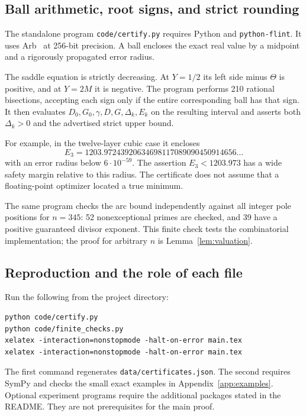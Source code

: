 \subsection{Ball arithmetic, root signs, and strict rounding}

The standalone program \texttt{code/certify.py} requires Python and
\texttt{python-flint}. It uses Arb~\cite{Arb} at 256-bit precision.
A ball encloses the exact real value by a midpoint and a rigorously
propagated error radius.

The saddle equation is strictly decreasing. At \(Y=1/2\) its
left side minus \(\Theta\) is positive, and at \(Y=2M\) it is
negative. The program performs 210 rational bisections, accepting
each sign only if the entire corresponding ball has that sign.
It then evaluates \(D_0,G_0,\gamma,D,G,\Delta_k,E_k\) on the
resulting interval and asserts both \(\Delta_k>0\) and the advertised
strict upper bound.

For example, in the twelve-layer cubic case it encloses
\[
E_3=1203.97243920634698117089090450914656\ldots
\]
with an error radius below \(6\cdot10^{-59}\).
The assertion \(E_3<1203.973\) has a wide safety margin relative
to this radius. The certificate does not assume that a floating-point
optimizer located a true minimum.

The same program checks the arc bound independently against
all integer pole positions for \(n=345\): 52 nonexceptional primes
are checked, and 39 have a positive guaranteed divisor exponent.
This finite check tests the combinatorial implementation; the
proof for arbitrary \(n\) is Lemma~\ref{lem:valuation}.

\subsection{Reproduction and the role of each file}

Run the following from the project directory:
\begin{verbatim}
python code/certify.py
python code/finite_checks.py
xelatex -interaction=nonstopmode -halt-on-error main.tex
xelatex -interaction=nonstopmode -halt-on-error main.tex
\end{verbatim}
The first command regenerates \texttt{data/certificates.json}.
The second requires SymPy and checks the small exact examples in
Appendix~\ref{app:examples}.
Optional experiment programs require the additional packages stated
in the README. They are not prerequisites for the main proof.

